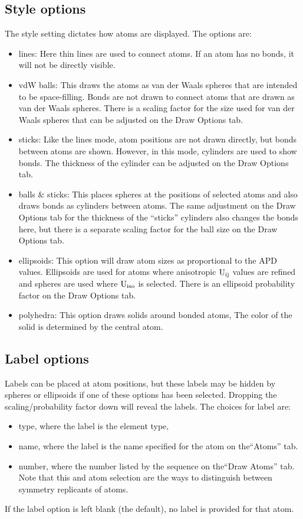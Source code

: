 \subsection{Style options}
The style setting dictates how atoms are displayed. The options are:
\begin{itemize}
    \item lines: Here thin lines are used to connect atoms. If an atom has no bonds, it will not be directly visible.
    \item vdW balls: This draws the atoms as van der Waals spheres that are intended to be space-filling. Bonds are not drawn to connect atoms  that are drawn as van der Waals spheres. There is a scaling factor for the size used for van der Waals spheres that can be adjusted on the Draw Options tab.
    \item sticks: Like the lines mode, atom positions are not drawn directly, but bonds between atoms are shown. However, in this mode, cylinders are used to show bonds. The thickness of the cylinder can be adjusted on the Draw Options tab.
    \item balls \& sticks: This places spheres at the positions of selected atoms and also draws bonds as cylinders between atoms. The same adjustment on the Draw Options tab for the thickness of the ``sticks'' cylinders also changes the bonds here, but there is a separate scaling factor for the ball size on the Draw Options tab.
    \item ellipsoids: This option will draw atom sizes as proportional to the APD values. Ellipsoids are used for atoms where anisotropic $\rm U_{ij}$ values are refined and spheres are used where $\rm U_{iso}$ is selected. There is an ellipsoid probability factor on the Draw Options tab.
    \item polyhedra: This option draws solids around bonded atoms, The color of the solid is determined by the central atom. 
\end{itemize}

\subsection{Label options}
Labels can be placed at atom positions, but these labels may be hidden by spheres or ellipsoids if one of these options has been selected. Dropping the scaling/probability factor down will reveal the labels. The choices for label are:
\begin{itemize}
    \item type, where the label is the element type, 
    \item name, where the label is the name specified for the atom on the``Atoms'' tab.
    \item number, where the number listed by the sequence on the``Draw Atoms'' tab. Note that this and atom selection are the ways to distinguish between symmetry replicants of atoms.  
\end{itemize}
If the label option is left blank (the default), no label is provided for that atom. 

